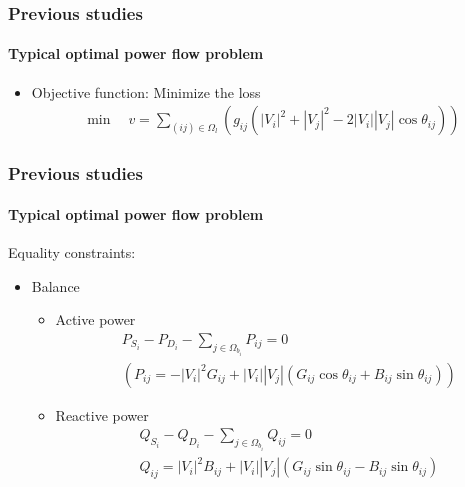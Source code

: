\documentclass[
	11pt, %
	aspectratio=169, %
]{beamer}
\begin{document}

\begin{frame}
	\frametitle{Previous studies}
	\framesubtitle{Typical optimal power flow problem}
	\begin{itemize}
		\item Objective function: Minimize the loss
		\begin{align*}
			\min \quad v= \sum_{(ij) \in \Omega_{l} }
			(g_{ij}(\left|V_{i}\right|^{2}+\left|V_{j}\right|^{2}-2\left|V_{i}\right| \left|V_{j}\right|\cos\theta_{ij}))
		\end{align*}
	\end{itemize}
\end{frame}




\begin{frame}
	\frametitle{Previous studies}
	\framesubtitle{Typical optimal power flow problem}
	
	Equality constraints:
	\begin{itemize}
	\item Balance
		\begin{itemize}
			\item Active power
				\begin{align*}
					&P_{S_{i}}-P_{D_{i}}-\sum_{j \in \Omega_{b_{i}}} P_{ij} = 0\\
					&(P_{ij}=-\left|V_{i} \right|^{2}G_{ij}+\left|V_{i} \right|\left|V_{j} \right|(G_{ij}\cos\theta_{ij} + B_{ij}\sin\theta_{ij}))
				\end{align*}

			\item Reactive power
				\begin{align*}
					&Q_{S_{i}}-Q_{D_{i}}-\sum_{j \in \Omega_{b_{i}}} Q_{ij} = 0\\
					&Q_{ij}=\left|V_{i} \right|^{2}B_{ij}+\left|V_{i} \right|\left|V_{j} \right|(G_{ij}\sin\theta_{ij} - B_{ij}\sin\theta_{ij})
				\end{align*}
		\end{itemize}

	\end{itemize}
	
	
\end{frame}


\end{document}
